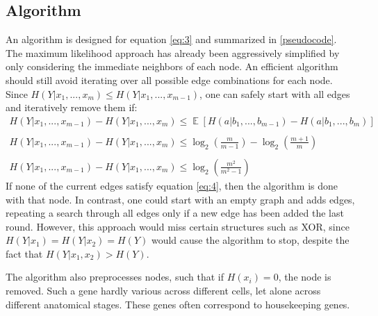 \documentclass[11pt]{amsart}
\DeclareMathOperator{\EX}{\mathbb{E}}
\begin{document}
\subsection{Algorithm}
An algorithm is designed for equation \ref{eq:3} and summarized in \ref{pseudocode}. The maximum likelihood approach has already been aggressively simplified by only considering the immediate neighbors of each node. An efficient algorithm should still avoid iterating over all possible edge combinations for each node. Since $H(Y|x_1,...,x_m) \leq H(Y|x_1,...,x_{m-1})$, one can safely start with all edges and iteratively remove them if:
\begin{equation} \label{eq:4}
\begin{split}
H(Y|x_1,...,x_{m-1}) -  H(Y|x_1,...,x_m) \leq \EX[{H(a|b_1,...,b_{m-1}) -  H(a|b_1,...,b_m)}]  \\ \\
H(Y|x_1,...,x_{m-1}) -  H(Y|x_1,...,x_m) \leq \log_2(\frac{m}{m-1}) - \log_2(\frac{m+1}{m})  \\ \\
H(Y|x_1,...,x_{m-1}) -  H(Y|x_1,...,x_m) \leq \log_2(\frac{m^2}{m^2-1})  
\end{split}
\end{equation}
If none of the current edges satisfy equation \ref{eq:4}, then the algorithm is done with that node. In contrast, one could start with an empty graph and adds edges, repeating a search through all edges only if a new edge has been added the last round. However, this approach would miss certain structures such as XOR, since $H(Y|x_1) = H(Y|x_2) = H(Y)$ would cause the algorithm to stop, despite the fact that  $H(Y|x_1,x_2) > H(Y)$.

The algorithm also preprocesses nodes, such that if $H(x_i) = 0$, the node is removed. Such a gene hardly various across different cells, let alone across different anatomical stages. These genes often correspond to housekeeping genes.
\end{document}
